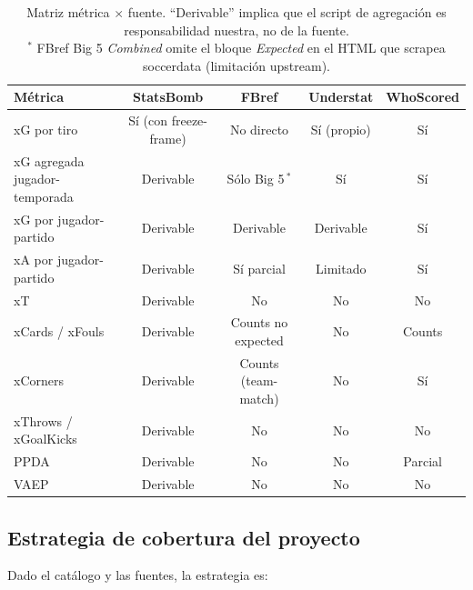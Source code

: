 \begin{table}[h]
\centering
\small
\begin{tabular}{lcccc}
\toprule
\textbf{Métrica} & \textbf{StatsBomb} & \textbf{FBref} & \textbf{Understat} & \textbf{WhoScored} \\
\midrule
xG por tiro                 & Sí (con freeze-frame) & No directo & Sí (propio)   & Sí \\
xG agregada jugador-temporada & Derivable           & Sólo Big 5\,$^{*}$ & Sí       & Sí \\
xG por jugador-partido       & Derivable             & Derivable & Derivable      & Sí \\
xA por jugador-partido       & Derivable             & Sí parcial & Limitado      & Sí \\
xT                           & Derivable             & No        & No             & No \\
xCards / xFouls              & Derivable             & Counts no expected & No   & Counts \\
xCorners                     & Derivable             & Counts (team-match) & No  & Sí \\
xThrows / xGoalKicks         & Derivable             & No        & No             & No \\
PPDA                         & Derivable             & No        & No             & Parcial \\
VAEP                         & Derivable             & No        & No             & No \\
\bottomrule
\end{tabular}
\caption{Matriz métrica $\times$ fuente. ``Derivable'' implica que el script de agregación es responsabilidad nuestra, no de la fuente. \\$^{*}$ FBref Big 5 \emph{Combined} omite el bloque \emph{Expected} en el HTML que scrapea soccerdata (limitación upstream).}
\end{table}

\subsection{Estrategia de cobertura del proyecto}

Dado el catálogo y las fuentes, la estrategia es:

